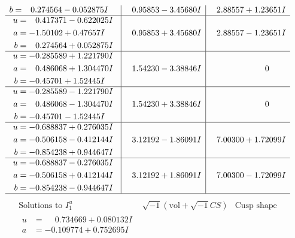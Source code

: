 \documentclass[1p]{elsarticle_modified}
\theoremstyle{definition}
\newcommand{\I}{\sqrt{-1}}
\begin{document}
$$\begin{array}{c|c|c}
\begin{aligned}
b &= \phantom{-}0.274564 - 0.052875 I\end{aligned}
 & \phantom{-}0.95853 - 3.45680 I & \phantom{-}2.88557 + 1.23651 I \\ \hline\begin{aligned}
u &= \phantom{-}0.417371 - 0.622025 I \\
a &= -1.50102 + 0.47657 I \\
b &= \phantom{-}0.274564 + 0.052875 I\end{aligned}
 & \phantom{-}0.95853 + 3.45680 I & \phantom{-}2.88557 - 1.23651 I \\ \hline\begin{aligned}
u &= -0.285589 + 1.221790 I \\
a &= \phantom{-}0.486068 + 1.304470 I \\
b &= -0.45701 + 1.52445 I\end{aligned}
 & \phantom{-}1.54230 - 3.38846 I & \phantom{-0.000000 } 0 \\ \hline\begin{aligned}
u &= -0.285589 - 1.221790 I \\
a &= \phantom{-}0.486068 - 1.304470 I \\
b &= -0.45701 - 1.52445 I\end{aligned}
 & \phantom{-}1.54230 + 3.38846 I & \phantom{-0.000000 } 0 \\ \hline\begin{aligned}
u &= -0.688837 + 0.276035 I \\
a &= -0.506158 - 0.412144 I \\
b &= -0.854238 + 0.944647 I\end{aligned}
 & \phantom{-}3.12192 - 1.86091 I & \phantom{-}7.00300 + 1.72099 I \\ \hline\begin{aligned}
u &= -0.688837 - 0.276035 I \\
a &= -0.506158 + 0.412144 I \\
b &= -0.854238 - 0.944647 I\end{aligned}
 & \phantom{-}3.12192 + 1.86091 I & \phantom{-}7.00300 - 1.72099 I\\
 \hline 
 \end{array}$$\newpage$$\begin{array}{c|c|c}  
\text{Solutions to }I^u_{1}& \I (\text{vol} + \sqrt{-1}CS) & \text{Cusp shape}\\
 \hline 
\begin{aligned}
u &= \phantom{-}0.734669 + 0.080132 I \\
a &= -0.109774 + 0.752695 I \\

\end{aligned}
\end{array}$$
\end{document}
